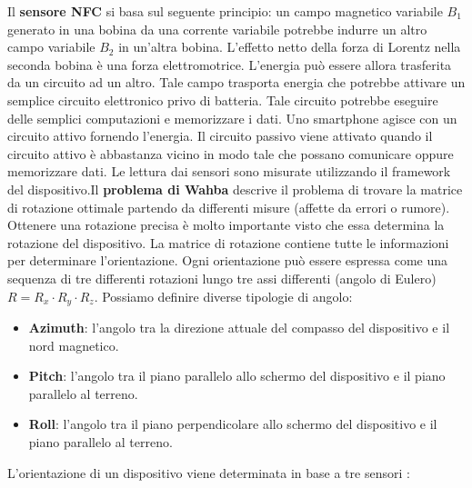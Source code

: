 Il \textbf{sensore NFC} si basa sul seguente principio: un campo magnetico variabile $B_1$ generato in una bobina da una corrente variabile potrebbe indurre un altro campo variabile $B_2$ in un'altra bobina. L'effetto netto della forza di Lorentz nella seconda bobina è una forza elettromotrice. L'energia può essere allora trasferita da un circuito ad un altro. Tale campo trasporta energia che potrebbe attivare un semplice circuito elettronico privo di batteria. Tale circuito potrebbe eseguire delle semplici computazioni e memorizzare i dati. Uno smartphone agisce con un circuito attivo fornendo l'energia.
Il circuito passivo viene attivato quando il circuito attivo è abbastanza vicino in modo tale che possano comunicare oppure memorizzare dati. Le lettura dai sensori sono misurate utilizzando il framework del dispositivo.Il \textbf{problema di Wahba} descrive il problema di trovare la matrice di rotazione ottimale partendo da differenti misure (affette da errori o rumore). Ottenere una rotazione precisa è molto importante visto che essa determina la rotazione del dispositivo. La matrice di rotazione contiene tutte le informazioni per determinare l'orientazione. Ogni orientazione può essere espressa come una sequenza di tre differenti rotazioni lungo tre assi differenti (angolo di Eulero) $R = R_x \cdot R_y \cdot R_z$. Possiamo definire diverse tipologie di angolo:
\begin{itemize}
    \item \textbf{Azimuth}: l'angolo tra la direzione attuale del compasso del dispositivo e il nord magnetico.
    \item \textbf{Pitch}: l'angolo tra il piano parallelo allo schermo del dispositivo e il piano parallelo al terreno.
    \item \textbf{Roll}: l'angolo tra il piano perpendicolare allo schermo del dispositivo e il piano parallelo al terreno.
\end{itemize}
L'orientazione di un dispositivo viene determinata in base a tre sensori :
